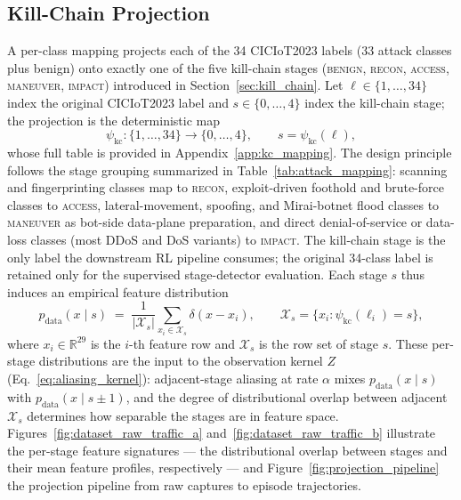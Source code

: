 \subsection{Kill-Chain Projection}\label{ssec:kc_projection}
A per-class mapping projects each of the 34 CICIoT2023 labels (33 attack classes plus benign) onto exactly one of the five kill-chain stages (\textsc{benign}, \textsc{recon}, \textsc{access}, \textsc{maneuver}, \textsc{impact}) introduced in Section~\ref{sec:kill_chain}. Let $\ell \in \{1, \dots, 34\}$ index the original CICIoT2023 label and $s \in \{0, \dots, 4\}$ index the kill-chain stage; the projection is the deterministic map
\begin{equation}\label{eq:kc_projection}
\psi_{\text{kc}}: \{1, \dots, 34\} \to \{0, \dots, 4\}, \qquad s = \psi_{\text{kc}}(\ell),
\end{equation}
whose full table is provided in Appendix~\ref{app:kc_mapping}. The design principle follows the stage grouping summarized in Table~\ref{tab:attack_mapping}: scanning and fingerprinting classes map to \textsc{recon}, exploit-driven foothold and brute-force classes to \textsc{access}, lateral-movement, spoofing, and Mirai-botnet flood classes to \textsc{maneuver} as bot-side data-plane preparation, and direct denial-of-service or data-loss classes (most DDoS and DoS variants) to \textsc{impact}. The kill-chain stage is the only label the downstream RL pipeline consumes; the original 34-class label is retained only for the supervised stage-detector evaluation. Each stage $s$ thus induces an empirical feature distribution
\begin{equation}\label{eq:stage_distribution}
p_{\text{data}}(x \mid s) \;=\; \frac{1}{|\mathcal{X}_s|} \sum_{x_i \in \mathcal{X}_s} \delta(x - x_i), \qquad \mathcal{X}_s = \{x_i : \psi_{\text{kc}}(\ell_i) = s\},
\end{equation}
where $x_i \in \mathbb{R}^{29}$ is the $i$-th feature row and $\mathcal{X}_s$ is the row set of stage $s$. These per-stage distributions are the input to the observation kernel $Z$ (Eq.~\eqref{eq:aliasing_kernel}): adjacent-stage aliasing at rate $\alpha$ mixes $p_{\text{data}}(x \mid s)$ with $p_{\text{data}}(x \mid s \pm 1)$, and the degree of distributional overlap between adjacent $\mathcal{X}_s$ determines how separable the stages are in feature space. Figures~\ref{fig:dataset_raw_traffic_a} and~\ref{fig:dataset_raw_traffic_b} illustrate the per-stage feature signatures --- the distributional overlap between stages and their mean feature profiles, respectively --- and Figure~\ref{fig:projection_pipeline} the projection pipeline from raw captures to episode trajectories.

